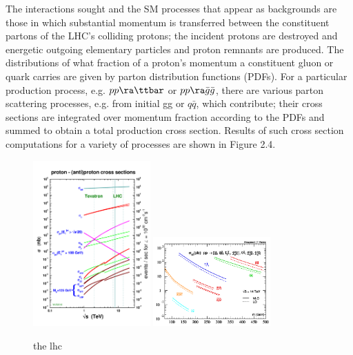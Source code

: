 The interactions sought and the SM processes that appear as backgrounds are those in 
which substantial momentum is transferred between the constituent partons of the LHC’s 
colliding protons; the incident protons are destroyed and energetic outgoing elementary 
particles and proton remnants are produced. The distributions of what fraction of a 
proton’s momentum a constituent gluon or quark carries are given by parton distribution 
functions (PDFs). For a particular production process, e.g. $pp \ra \ttbar$ or 
$pp \ra \bar{g}\bar{g}$, there are various parton scattering processes, e.g. 
from initial gg or $q\bar{q}$, which contribute; their cross sections are integrated over momentum fraction according to 
the PDFs and summed to obtain a total production cross section.
Results of such cross section computations for a variety of processes are shown
in Figure 2.4. 

\begin{figure}[h!t]
  \begin{center}
      \includegraphics[width=0.40\textwidth,trim=0 2cm 0 0]{figures/crosssections2012_v5}
      \includegraphics[width=0.40\textwidth,]{figures/PEacs.png}
      \caption{\label{fig:int_lumi} the lhc}
  \end{center}
\end{figure}

